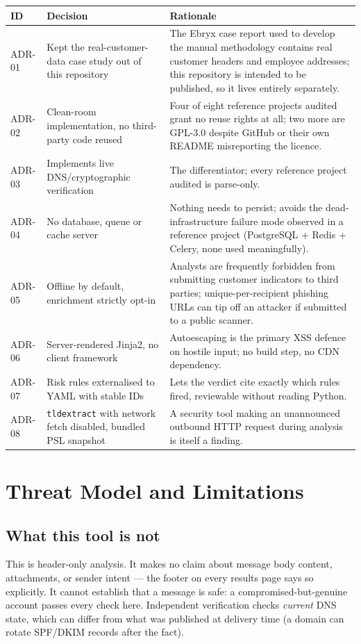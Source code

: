 \documentclass[11pt,a4paper]{article}
\begin{document}
\renewcommand{\arraystretch}{1.25}
\begin{longtable}{@{}p{0.9cm}p{5.6cm}p{9.4cm}@{}}
\toprule
\textbf{ID} & \textbf{Decision} & \textbf{Rationale} \\
\midrule
\endhead
ADR-01 & Kept the real-customer-data case study out of this repository & The Ebryx case
report used to develop the manual methodology contains real customer headers and employee
addresses; this repository is intended to be published, so it lives entirely separately. \\
ADR-02 & Clean-room implementation, no third-party code reused & Four of eight reference
projects audited grant no reuse rights at all; two more are GPL-3.0 despite GitHub or their
own README misreporting the licence. \\
ADR-03 & Implements live DNS/cryptographic verification & The differentiator; every reference
project audited is parse-only. \\
ADR-04 & No database, queue or cache server & Nothing needs to persist; avoids the
dead-infrastructure failure mode observed in a reference project (PostgreSQL + Redis + Celery,
none used meaningfully). \\
ADR-05 & Offline by default, enrichment strictly opt-in & Analysts are frequently forbidden
from submitting customer indicators to third parties; unique-per-recipient phishing URLs can
tip off an attacker if submitted to a public scanner. \\
ADR-06 & Server-rendered Jinja2, no client framework & Autoescaping is the primary XSS defence
on hostile input; no build step, no CDN dependency. \\
ADR-07 & Risk rules externalised to YAML with stable IDs & Lets the verdict cite exactly which
rules fired, reviewable without reading Python. \\
ADR-08 & \texttt{tldextract} with network fetch disabled, bundled PSL snapshot & A security
tool making an unannounced outbound HTTP request during analysis is itself a finding. \\
\bottomrule
\end{longtable}

\section{Threat Model and Limitations}

\subsection{What this tool is not}
This is header-only analysis. It makes no claim about message body content, attachments, or
sender intent — the footer on every results page says so explicitly. It cannot establish that
a message is safe: a compromised-but-genuine account passes every check here. Independent
verification checks \emph{current} DNS state, which can differ from what was published at
delivery time (a domain can rotate SPF/DKIM records after the fact).
\end{document}
